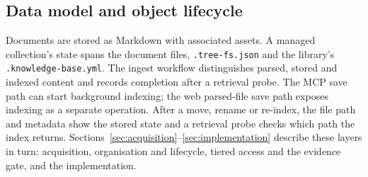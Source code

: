 \subsection{Data model and object lifecycle}
\label{sec:datamodel}
\label{sec:lifecycle}

Documents are stored as Markdown with associated assets. A managed
collection's state spans the document files, \texttt{.tree-fs.json} and the
library's \texttt{.knowledge-base.yml}. The ingest workflow distinguishes
parsed, stored and indexed content and records completion after a retrieval
probe. The MCP save path can start background indexing; the web parsed-file
save path exposes indexing as a separate operation. After a move, rename
or re-index, the file path and metadata show the stored state and a
retrieval probe checks which path the index returns.
Sections~\ref{sec:acquisition}--\ref{sec:implementation} describe these
layers in turn: acquisition, organisation and lifecycle, tiered access
and the evidence gate, and the implementation.
